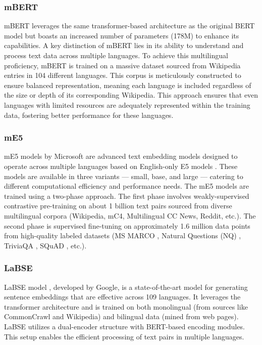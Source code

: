 \subsubsection{mBERT} \label{model:mbert}
\ac{mBERT} \cite{bert_mbert} leverages the same transformer-based architecture as the original \ac{BERT} model but boasts an increased number of parameters (178M) to enhance its capabilities.
A key distinction of \ac{mBERT} lies in its ability to understand and process text data across multiple languages.
To achieve this multilingual proficiency, \ac{mBERT} is trained on a massive dataset sourced from Wikipedia entries in 104 different languages.
This corpus is meticulously constructed to ensure balanced representation, meaning each language is included regardless of the size or depth of its corresponding Wikipedia.
This approach ensures that even languages with limited resources are adequately represented within the training data, fostering better performance for these languages.

\subsubsection{\ac{mE5}} \label{model:me5}
\ac{mE5} models by Microsoft \cite{mE5} are advanced text embedding models designed to operate across multiple languages based on English-only E5 models \cite{E5}.
These models are available in three variants — small, base, and large — catering to different computational efficiency and performance needs.
The \ac{mE5} models are trained using a two-phase approach.
The first phase involves weakly-supervised contrastive pre-training on about 1 billion text pairs sourced from diverse multilingual corpora (Wikipedia, mC4, Multilingual CC News, Reddit, etc.).
The second phase is supervised fine-tuning on approximately 1.6 million data points from high-quality labeled datasets (MS MARCO \cite{ms_marco_dataset}, Natural Questions (NQ) \cite{NQ_dataset}, TriviaQA \cite{TriviaQA}, SQuAD \cite{SQuAD}, etc.).

\subsubsection{LaBSE} \label{model:labse}
\ac{LaBSE} model \cite{LaBSE}, developed by Google, is a state-of-the-art model for generating sentence embeddings that are effective across 109 languages.
It leverages the transformer architecture and is trained on both monolingual (from sources like CommonCrawl and Wikipedia) and bilingual data (mined from web pages).
LaBSE utilizes a dual-encoder structure with \ac{BERT}-based encoding modules.
This setup enables the efficient processing of text pairs in multiple languages.


